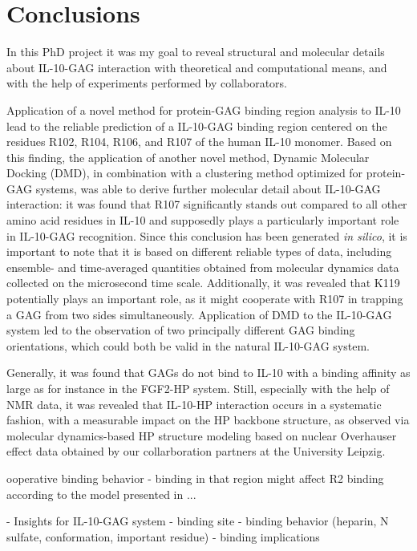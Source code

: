 \chapter{Conclusions}

In this PhD project it was my goal to reveal structural and molecular details
about IL-10-GAG interaction with theoretical and computational means, and with
the help of experiments performed by collaborators.

Application of a novel method for protein-GAG binding region analysis to IL-10
lead to the reliable prediction of a IL-10-GAG binding region centered on the
residues R102, R104, R106, and R107 of the human IL-10 monomer. Based on this
finding, the application of another novel method, Dynamic Molecular Docking
(DMD), in combination with a clustering method optimized for protein-GAG
systems, was able to derive further molecular detail about IL-10-GAG
interaction: it was found that R107 significantly stands out compared to all
other amino acid residues in IL-10 and supposedly plays a particularly important
role in IL-10-GAG recognition. Since this conclusion has been generated
\textit{in silico}, it is important to note that it is based on different
reliable types of data, including ensemble- and time-averaged quantities
obtained from molecular dynamics data collected on the microsecond time scale.
Additionally, it was revealed that K119 potentially plays an important role, as
it might cooperate with R107 in trapping a GAG from two sides simultaneously.
Application of DMD to the IL-10-GAG system led to the observation of two
principally different GAG binding orientations, which could both be valid in the
natural IL-10-GAG system.

Generally, it was found that GAGs do not bind to IL-10 with a binding affinity
as large as for instance in the FGF2-HP system. Still, especially with the help
of NMR data, it was revealed that IL-10-HP interaction occurs in a systematic
fashion, with a measurable impact on the HP backbone structure, as observed via
molecular dynamics-based HP structure modeling based on nuclear Overhauser
effect data obtained by our collarboration partners at the University Leipzig.

ooperative binding behavior
- binding in that region might affect R2 binding according to the model
    presented in ...






    - Insights for IL-10-GAG system
        - binding site
        - binding behavior (heparin, N sulfate, conformation, important residue)
        - binding implications


